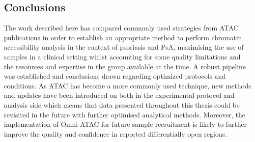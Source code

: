 \subsection{Conclusions}
The work described here has compared commonly used strategies from ATAC publications in order to establish an appropriate method to perform chromatin accessibility analysis in the context of psoriasis and PsA, maximising the use of samples in a clinical setting whilst accounting for some quality limitations and the resources and expertise in the group available at the time. A robust pipeline was established and conclusions drawn regarding optimized protocols and conditions. As ATAC has become a more commonly used technique, new methods and updates have been introduced on both in the experimental protocol and analysis side which means that data presented throughout this thesis could be revisited in the future with further optimised analytical methods. Moreover, the implementation of Omni-ATAC for future sample recruitment is likely to further improve the quality and confidence in reported differentially open regions.
